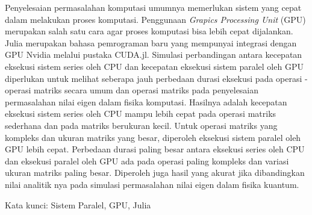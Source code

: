 \documentclass{skripsiactugm}
\begin{document}


\begin{abstractind}
	Penyelesaian permasalahan komputasi umumnya memerlukan sistem yang cepat dalam melakukan proses komputasi. Penggunaan \emph{Grapics Processing Unit} (GPU) merupakan salah satu cara agar proses komputasi bisa lebih cepat dijalankan. Julia merupakan bahasa pemrograman baru yang mempunyai integrasi dengan GPU Nvidia melalui pustaka CUDA.jl. Simulasi perbandingan antara kecepatan eksekusi sistem series oleh CPU dan kecepatan eksekusi sistem paralel oleh GPU diperlukan untuk melihat seberapa jauh perbedaan durasi eksekusi pada operasi - operasi matriks secara umum dan operasi matriks pada penyelesaian permasalahan nilai eigen dalam fisika komputasi. Hasilnya adalah kecepatan eksekusi sistem series oleh CPU mampu lebih cepat pada operasi matriks sederhana dan pada matriks berukuran kecil. Untuk operasi matriks yang kompleks dan ukuran matriks yang besar, diperoleh eksekusi sistem paralel oleh GPU lebih cepat. Perbedaan durasi paling besar antara eksekusi series oleh CPU dan eksekusi paralel oleh GPU ada pada operasi paling kompleks dan variasi ukuran matriks paling besar. Diperoleh juga hasil yang akurat jika dibandingkan nilai analitik nya pada simulasi permasalahan nilai eigen dalam fisika kuantum.

	\vspace{0.4cm}
	\noindent
	Kata kunci: Sistem Paralel, GPU, Julia
\end{abstractind}
\end{document}
